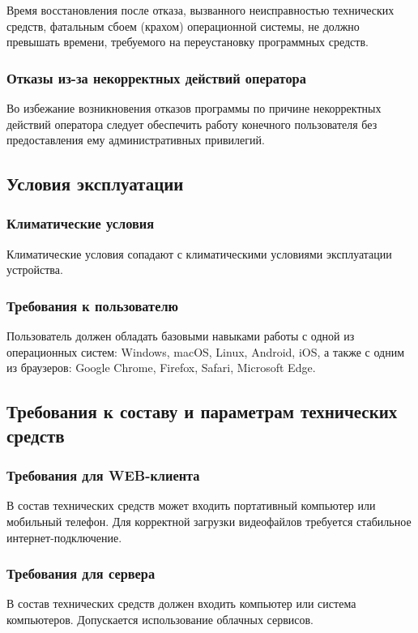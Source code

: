 Время восстановления после отказа, вызванного неисправностью технических средств, фатальным сбоем (крахом) операционной
системы, не должно превышать времени, требуемого на переустановку программных средств.

\subsubsection{Отказы из-за некорректных действий оператора}
Во избежание возникновения отказов программы по причине некорректных действий оператора следует обеспечить работу
конечного пользователя без предоставления ему административных привилегий.

\subsection{Условия эксплуатации}

\subsubsection{Климатические условия}

Климатические условия сопадают с климатическими условиями эксплуатации устройства.

\subsubsection{Требования к пользователю}

Пользователь должен обладать базовыми навыками работы с одной из операционных систем: Windows, macOS, Linux, Android,
iOS, а также с одним из браузеров: Google Chrome, Firefox, Safari, Microsoft Edge.

\subsection{Требования к составу и параметрам технических средств}

\subsubsection{Требования для WEB-клиента}
В состав технических средств может входить портативный компьютер или мобильный телефон.
Для корректной загрузки видеофайлов требуется стабильное интернет-подключение.

\subsubsection{Требования для сервера}
В состав технических средств должен входить компьютер или система компьютеров.
Допускается использование облачных сервисов.

